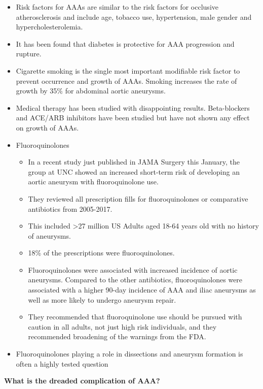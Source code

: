\documentclass[
]{book}
\begin{document}
\begin{itemize}
\item
  Risk factors for AAAs are similar to the risk factors for occlusive
  atherosclerosis and include age, tobacco use, hypertension, male
  gender and hypercholesterolemia.
\item
  It has been found that diabetes is protective for AAA progression
  and rupture.
\item
  Cigarette smoking is the single most important modifiable risk
  factor to prevent occurrence and growth of AAAs. Smoking increases
  the rate of growth by 35\% for abdominal aortic aneurysms.
\item
  Medical therapy has been studied with disappointing results.
  Beta-blockers and ACE/ARB inhibitors have been studied but have not
  shown any effect on growth of AAAs.
\item
  Fluoroquinolones

  \begin{itemize}
  \item
    In a recent study just published in JAMA Surgery this January,
    the group at UNC showed an increased short-term risk of
    developing an aortic aneurysm with fluoroquinolone use.
    \citep{newtonAssociationFluoroquinoloneUse2021a}
  \item
    They reviewed all prescription fills for fluoroquinolones or
    comparative antibiotics from 2005-2017.
  \item
    This included \textgreater27 million US Adults aged 18-64 years old with no
    history of aneurysms.
  \item
    18\% of the prescriptions were fluoroquinolones.
  \item
    Fluoroquinolones were associated with increased incidence of
    aortic aneurysms. Compared to the other antibiotics,
    fluoroquinolones were associated with a higher 90-day incidence
    of AAA and iliac aneurysms as well as more likely to undergo
    aneurysm repair.
  \item
    They recommended that fluoroquinolone use should be pursued with
    caution in all adults, not just high risk individuals, and they
    recommended broadening of the warnings from the FDA.
  \end{itemize}
\item
  Fluoroquinolones playing a role in dissections and aneurysm
  formation is often a highly tested question
\end{itemize}

\textbf{What is the dreaded complication of AAA?}
\citep{mooreVascularEndovascularSurgery2019}
\end{document}
